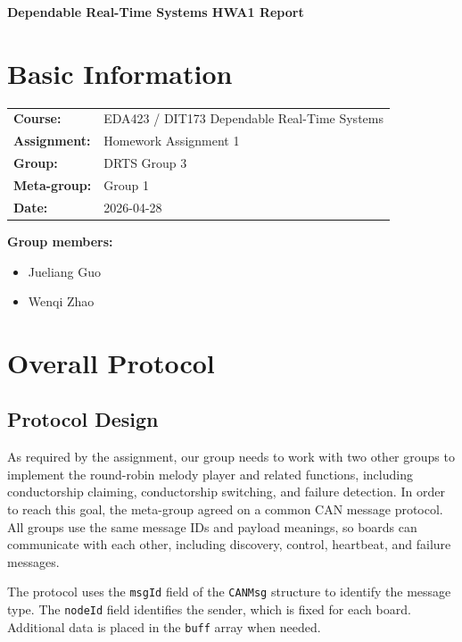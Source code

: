 \documentclass[11pt,a4paper]{article}
\newcommand{\infoRow}[2]{\textbf{#1:} & #2 \\[0.75em]}
\begin{document}
\begin{center}
{\LARGE\bfseries Dependable Real-Time Systems HWA1 Report}
\end{center}
\vspace{0.8em}

\section*{Basic Information}

\vspace{0.4em}
\begin{tabular}{@{}p{}p{}@{}}
\infoRow{Course}{EDA423 / DIT173 Dependable Real-Time Systems}
\infoRow{Assignment}{Homework Assignment 1}
\infoRow{Group}{DRTS Group 3}
\infoRow{Meta-group}{Group 1}
\infoRow{Date}{2026-04-28}
\end{tabular}
\vspace{0.35em}

\textbf{Group members:}

\begin{itemize}[itemsep=0.25em, topsep=0.35em]
  \item Jueliang Guo
  \item Wenqi Zhao
\end{itemize}

\section*{Overall Protocol}

\subsection*{Protocol Design}

As required by the assignment, our group needs to work with two other groups to implement the round-robin melody player and related functions, including conductorship claiming, conductorship switching, and failure detection. In order to reach this goal, the meta-group agreed on a common CAN message protocol. All groups use the same message IDs and payload meanings, so boards can communicate with each other, including discovery, control, heartbeat, and failure messages.

The protocol uses the \texttt{msgId} field of the \texttt{CANMsg} structure to identify the message type. The \texttt{nodeId} field identifies the sender, which is fixed for each board. Additional data is placed in the \texttt{buff} array when needed.
\end{document}
